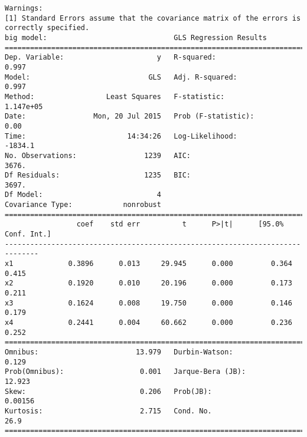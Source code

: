 \documentclass{article}
\begin{document}
\begin{verbatim}
Warnings:
[1] Standard Errors assume that the covariance matrix of the errors is correctly specified.
big model:                              GLS Regression Results                            
==============================================================================
Dep. Variable:                      y   R-squared:                       0.997
Model:                            GLS   Adj. R-squared:                  0.997
Method:                 Least Squares   F-statistic:                 1.147e+05
Date:                Mon, 20 Jul 2015   Prob (F-statistic):               0.00
Time:                        14:34:26   Log-Likelihood:                -1834.1
No. Observations:                1239   AIC:                             3676.
Df Residuals:                    1235   BIC:                             3697.
Df Model:                           4                                         
Covariance Type:            nonrobust                                         
==============================================================================
                 coef    std err          t      P>|t|      [95.0% Conf. Int.]
------------------------------------------------------------------------------
x1             0.3896      0.013     29.945      0.000         0.364     0.415
x2             0.1920      0.010     20.196      0.000         0.173     0.211
x3             0.1624      0.008     19.750      0.000         0.146     0.179
x4             0.2441      0.004     60.662      0.000         0.236     0.252
==============================================================================
Omnibus:                       13.979   Durbin-Watson:                   0.129
Prob(Omnibus):                  0.001   Jarque-Bera (JB):               12.923
Skew:                           0.206   Prob(JB):                      0.00156
Kurtosis:                       2.715   Cond. No.                         26.9
==============================================================================


\end{verbatim}
\end{document}
